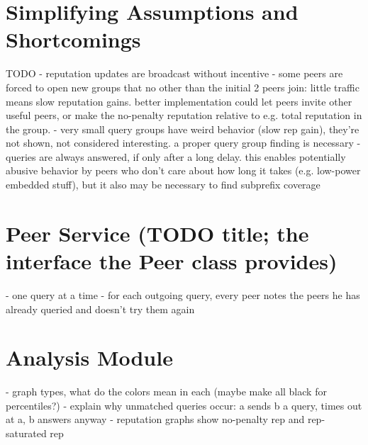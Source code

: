 \section{Simplifying Assumptions and Shortcomings}
TODO
- reputation updates are broadcast without incentive
- some peers are forced to open new groups that no other than the initial 2
  peers join: little traffic means slow reputation gains.
  better implementation could let peers invite other useful peers, or make the
  no-penalty reputation relative to e.g. total reputation in the group.
- very small query groups have weird behavior (slow rep gain), they're not
  shown, not considered interesting. a proper query group finding is necessary
- queries are always answered, if only after a long delay. this enables
  potentially abusive behavior by peers who don't care about how long it takes
  (e.g. low-power embedded stuff), but it also may be necessary to find
  subprefix coverage

\section{Peer Service (TODO title; the interface the Peer class provides)}
- one query at a time
- for each outgoing query, every peer notes the peers he has already queried and
  doesn't try them again
\section{Analysis Module}
- graph types, what do the colors mean in each (maybe make all black for
  percentiles?)
- explain why unmatched queries occur: a sends b a query, times out at a, b
  answers anyway
- reputation graphs show no-penalty rep and rep-saturated rep
